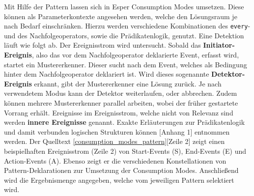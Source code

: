 Mit Hilfe der Pattern lassen sich in Esper Consumption Modes umsetzen.
Diese können als Parameterkontexte angesehen werden, welche den Lösungsraum je nach Bedarf einschränken.
Hierzu werden verschiedene Kombinationen des \texttt{every}- und des Nachfolgeoperators, sowie die Prädikatenlogik, genutzt.
Eine Detektion läuft wie folgt ab.
Der Ereignisstrom wird untersucht. Sobald das \textbf{Initiator-Ereignis}, also das vor dem Nachfolgeoperator deklarierte Event, erfasst wird, startet ein Mustererkenner. Dieser sucht nach dem Event, welches als Bedingung hinter dem Nachfolgeoperator deklariert ist. Wird dieses sogenannte \textbf{Detektor-Ereignis} erkannt, gibt der Mustererkenner eine Lösung zurück. Je nach verwendetem Modus kann der Detektor weiterlaufen, oder abbrechen. Zudem können mehrere Mustererkenner parallel arbeiten, wobei der früher gestartete Vorrang erhält.
Ereignisse im Ereignisstrom, welche nicht von Relevanz sind werden \textbf{innere Ereignisse} genannt.
Exakte Erläuterungen zur Prädikatenlogik und damit verbunden logischen Strukturen können \cite{CEP2017}[Anhang 1] entnommen werden.
Der Quelltext \ref{consumption_modes_pattern}[Zeile 2] zeigt einen beispielhaften Ereignisstrom (Zeile 2) von Start-Events (S), End-Events (E) und Action-Events (A). Ebenso zeigt er die verschiedenen Konstellationen von Pattern-Deklarationen zur Umsetzung der Consumption Modes. Anschließend wird die Ergebnismenge angegeben, welche vom jeweiligen Pattern selektiert wird.

